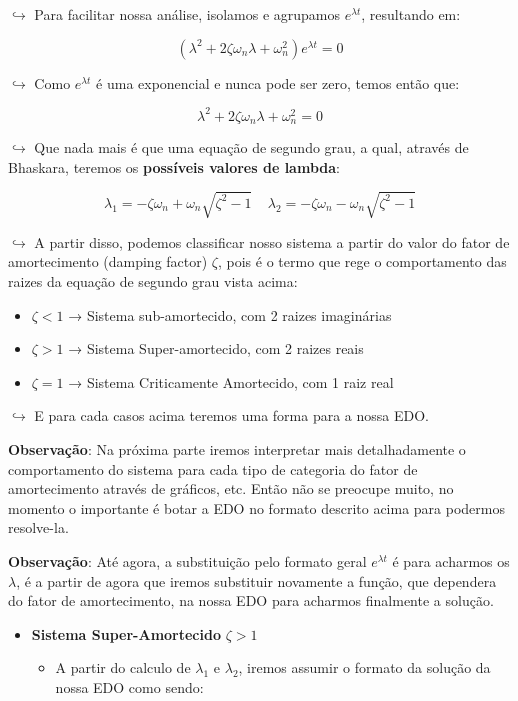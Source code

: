 \documentclass{article}
\begin{document}
\begin{itemize}
\(\hookrightarrow\) Para facilitar nossa análise, isolamos e agrupamos
\(e^{\lambda t}\), resultando em:

\[
(\lambda^2 + 2\zeta \omega_n \lambda + \omega_n^2) e^{\lambda t} = 0
\]

\(\hookrightarrow\) Como \(e^{\lambda t}\) é uma exponencial e nunca
pode ser zero, temos então que:

\[
\lambda^2 + 2\zeta \omega_n \lambda + \omega_n^2= 0
\]

\(\hookrightarrow\) Que nada mais é que uma equação de segundo grau, a
qual, através de Bhaskara, teremos os \textbf{possíveis valores de
lambda}:

\[
\lambda_1 = -\zeta\omega_n +\omega_n\sqrt{\zeta^2 - 1} \ \ \ \ \ \lambda_2 = -\zeta\omega_n -\omega_n\sqrt{\zeta^2 - 1}
\]

\(\hookrightarrow\) A partir disso, podemos classificar nosso sistema a
partir do valor do fator de amortecimento (damping factor) \(\zeta\),
pois é o termo que rege o comportamento das raizes da equação de segundo
grau vista acima:

\begin{itemize}
\tightlist
\item
  \(\zeta < 1\) → Sistema sub-amortecido, com 2 raizes imaginárias
\item
  \(\zeta > 1\) → Sistema Super-amortecido, com 2 raizes reais
\item
  \(\zeta = 1\) → Sistema Criticamente Amortecido, com 1 raiz real
\end{itemize}

\(\hookrightarrow\) E para cada casos acima teremos uma forma para a
nossa EDO.

\textbf{Observação}: Na próxima parte iremos interpretar mais
detalhadamente o comportamento do sistema para cada tipo de categoria do
fator de amortecimento através de gráficos, etc. Então não se preocupe
muito, no momento o importante é botar a EDO no formato descrito acima
para podermos resolve-la.

\textbf{Observação}: Até agora, a substituição pelo formato geral
\(e^{\lambda t}\) é para acharmos os \(\lambda\), é a partir de agora
que iremos substituir novamente a função, que dependera do fator de
amortecimento, na nossa EDO para acharmos finalmente a solução.

\begin{itemize}
\item
  \textbf{Sistema Super-Amortecido} \(\zeta > 1\)

  \begin{itemize}
  \item
    A partir do calculo de \(\lambda_1\) e \(\lambda_2\), iremos assumir
    o formato da solução da nossa EDO como sendo:


\end{itemize}
\end{itemize}
\end{itemize}
\end{document}
